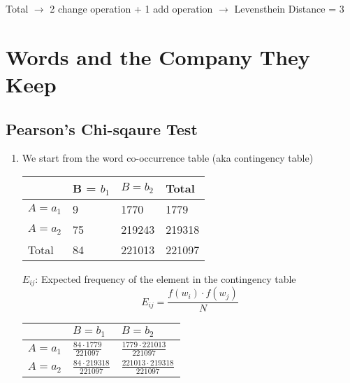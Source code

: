 \documentclass{article}
\begin{document}
	Total $\rightarrow$ 2 change operation + 1 add operation $\rightarrow$ Levensthein Distance = 3

\newpage
\section { Words and the Company They Keep }
	\subsection { Pearson's Chi-sqaure Test }
	\begin{enumerate}

	\item We start from the word co-occurrence table (aka contingency table)
	\begin{center}
	\begin{tabular} { | m{2cm} | m{2cm} | m{2cm} | m{2cm} | }
		\hline
		 & B = $b_1$ & $B = b_2$ & Total \\
		\hline
		$A = a_1$ & 9 & 1770 & 1779  \\
		\hline
		$A = a_2$ & 75 & 219243 & 219318 \\
		\hline
		Total & 84 & 221013 & 221097 \\
		\hline
	\end{tabular}
	\end{center}

	$E_{ij}$: Expected frequency of the element in the contingency table
	\begin{equation*}
		 E_{ij} = \frac{f(w_i) \cdot f(w_j)}{N}
	\end{equation*}

\renewcommand{\arraystretch}{1.5}

	\begin{center}
	\begin{tabular} { | m{2cm} | m{2cm} | m{2cm} |  }
		\hline
		 & $B = b_1$ & $B = b_2$ \\
		\hline
		$A = a_1$ & $\frac{84 \cdot 1779}{221097}$ & $\frac{1779 \cdot 221013}{221097}$ \\
		\hline
		$A = a_2$ & $\frac{84 \cdot 219318}{221097}$ & $\frac{221013 \cdot 219318}{221097}$ \\
		\hline
	\end{tabular}
	\end{center}


\end{enumerate}
\end{document}
